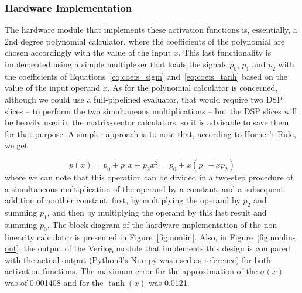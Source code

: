\subsubsection{Hardware Implementation}
The hardware module that implements these activation functions is, essentially, a 2nd degree polynomial calculator, where the coefficients of the polynomial are chosen accordingly with the value of the input $x$. This last functionality
is implemented using a simple multiplexer that loads the signals $p_0$, $p_1$ and $p_2$ with the coefficients of Equations~\ref{eq:coefs_sigm} and~\ref{eq:coefs_tanh} based on the value of the input operand $x$. As for the polynomial calculator is concerned, although we could use a full-pipelined evaluator, that would require two DSP slices -- to perform the two simultaneous multiplications -- but the DSP slices will be heavily used in the matrix-vector calculators, so it is advisable to save them for that purpose. A simpler approach is to note that, according to Horner's Rule, we get

\begin{equation}\label{eq:factorPol}
p(x) = p_0 + p_1x + p_2x^2 = p_0 + x(p_1 + xp_2)
\end{equation}
where we can note that this operation can be divided in a two-step procedure of a simultaneous multiplication of the operand by a constant,
and a subsequent addition of another constant: first, by multiplying the operand by $p_2$ and summing $p_1$, and then by multiplying the operand
by this last result and summing $p_0$. The block diagram of the hardware implementation of the non-linearity calculator is presented in Figure~\ref{fig:nonlin}.
Also, in Figure~\ref{fig:nonlin-out}, the output of the Verilog module that implements this design is compared with the actual output (Python3's Numpy was used as reference)
for both activation functions. The maximum error for the approximation of the $\sigma(x)$ was of 0.001408 and for the $\tanh(x)$ was 0.0121.

